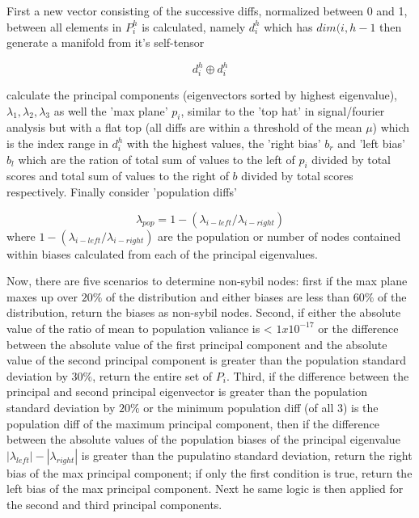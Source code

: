 \documentclass{article}
\begin{document}
First a new vector consisting of the successive diffs, normalized between 0 and 1, between all elements in $P_i^h$ is calculated, namely $d_i^h$ which has $dim(i, h-1$ then generate a manifold from it's self-tensor

\begin{equation}
d_i^h \oplus d_i^h
\end{equation}

calculate the principal components (eigenvectors sorted by highest eigenvalue), $\lambda_1, \lambda_2 ,\lambda_3$ as well the 'max plane' $p_i$, similar to the 'top hat' in signal/fourier analysis but with a flat top (all diffs are within a threshold of the mean $\mu$) which is the index range in $d_i^h$ with the highest values, the 'right bias' $b_r$ and 'left bias' $b_l$ which are the ration of total sum of values to the left of $p_i$ divided by total scores and  total sum of values to the right of $b$ divided by total scores respectively. Finally consider 'population diffs' 

\begin{equation}
\lambda_{pop} = 1-(\lambda_{i-left}/\lambda_{i-right})
\end{equation}
where $1-(\lambda_{i-left}/\lambda_{i-right})$  are the population or number of nodes contained within biases calculated from each of the principal eigenvalues.

Now, there are five scenarios to determine non-sybil nodes: first if the max plane maxes up over $20\%$ of the distribution and either biases are less than $60\%$ of the distribution, return the biases as non-sybil nodes. Second, if either the absolute value of the ratio of mean to population valiance is < $1x10^{-17}$ or the difference between the absolute value of the first principal component and the  absolute value of the second principal component is greater than the population standard deviation by $30\%$, return the entire set of $P_i$. Third, if the difference between the principal and second principal eigenvector is greater than the population standard deviation by $20\%$ or the minimum population diff (of all 3) is the population diff of the maximum principal component, then if the difference between the absolute values of the population biases of the principal eigenvalue $|\lambda_{left}| - |\lambda_{right}|$ is greater than the pupulatino standard deviation, return the right bias of the max principal component; if only the first condition is true, return the left bias of the max principal component. Next he same logic is then applied for the second and third principal components. 
\end{document}
